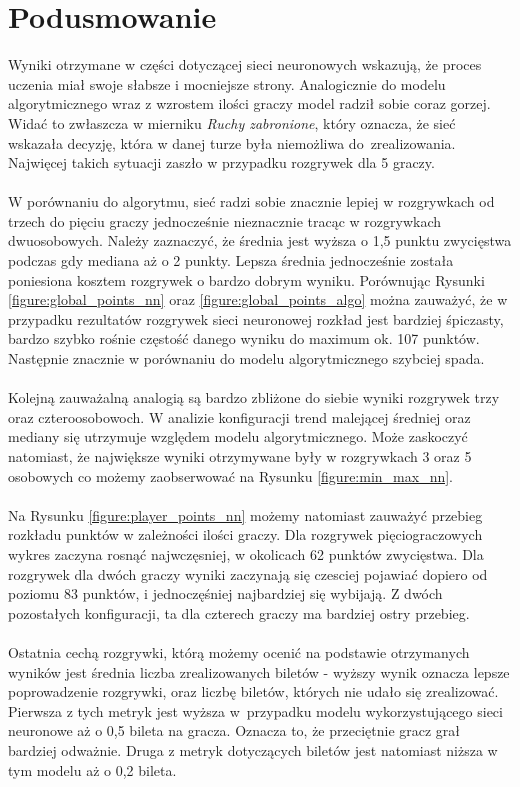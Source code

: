 \documentclass[12pt, oneside]{report}
\begin{document}
\section{Podusmowanie}
Wyniki otrzymane w części dotyczącej sieci neuronowych wskazują, że proces uczenia miał swoje słabsze i mocniejsze strony. Analogicznie do modelu algorytmicznego wraz z wzrostem ilości graczy model radził sobie coraz gorzej. Widać to zwłaszcza w mierniku \textit{Ruchy zabronione}, który oznacza, że sieć wskazała decyzję, która w danej turze była niemożliwa do~zrealizowania. Najwięcej takich sytuacji zaszło w przypadku rozgrywek dla 5 graczy. \\ \\
W porównaniu do algorytmu, sieć radzi sobie znacznie lepiej w rozgrywkach od trzech do pięciu graczy jednocześnie nieznacznie tracąc w rozgrywkach dwuosobowych. Należy zaznaczyć, że średnia jest wyższa o 1,5 punktu zwycięstwa podczas gdy mediana aż o 2 punkty. Lepsza średnia jednocześnie została poniesiona kosztem rozgrywek o bardzo dobrym wyniku. Porównując Rysunki \ref{figure:global_points_nn} oraz \ref{figure:global_points_algo} można zauważyć, że w przypadku rezultatów rozgrywek sieci neuronowej rozkład jest bardziej śpiczasty, bardzo szybko rośnie częstość danego wyniku do maximum ok. 107 punktów. Następnie znacznie w porównaniu do modelu algorytmicznego szybciej spada. \\ \\
Kolejną zauważalną analogią są bardzo zbliżone do siebie wyniki rozgrywek trzy oraz czteroosobowoch. W analizie konfiguracji trend malejącej średniej oraz mediany się utrzymuje względem modelu algorytmicznego. Może zaskoczyć natomiast, że największe wyniki otrzymywane były w rozgrywkach 3 oraz 5 osobowych co możemy zaobserwować na Rysunku \ref{figure:min_max_nn}. \\ \\
Na Rysunku \ref{figure:player_points_nn} możemy natomiast zauważyć przebieg rozkładu punktów w zależności ilości graczy. Dla rozgrywek pięciograczowych wykres zaczyna rosnąć najwczęsniej, w okolicach 62 punktów zwycięstwa. Dla rozgrywek dla dwóch graczy wyniki zaczynają się czesciej pojawiać dopiero od poziomu 83 punktów, i jednoczęśniej najbardziej się wybijają. Z dwóch pozostałych konfiguracji, ta dla czterech graczy ma bardziej ostry przebieg. \\ \\
Ostatnia cechą rozgrywki, którą możemy ocenić na podstawie otrzymanych wyników jest średnia liczba zrealizowanych biletów - wyższy wynik oznacza lepsze poprowadzenie rozgrywki, oraz liczbę biletów, których nie udało się zrealizować. Pierwsza z tych metryk jest wyższa w~przypadku modelu wykorzystującego sieci neuronowe aż o 0,5 bileta na gracza. Oznacza to, że przeciętnie gracz grał bardziej odważnie. Druga z metryk dotyczących biletów jest natomiast niższa w tym modelu aż o 0,2 bileta. 
\end{document}
